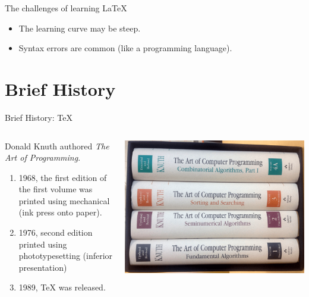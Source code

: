 \documentclass[english,aspectratio=169,14pt]{beamer}
\begin{document}
\begin{frame}{The challenges of learning \LaTeX}
    \begin{itemize}
        \item The learning curve may be steep.
        \item Syntax errors are common (like a programming language).
    \end{itemize}
\end{frame}

\section{Brief History}

\begin{frame}{Brief History: \TeX}
    \begin{columns}[T] %
    \begin{column}{9cm} %
    Donald Knuth authored \emph{The Art of Programming}.
    \begin{enumerate}
        \item 1968, the first edition of the first volume was printed using mechanical (ink press onto paper).
        \item 1976, second edition printed using phototypesetting (inferior presentation)
        \item 1989, \TeX{} was released.
    \end{enumerate}

    \end{column}
    \begin{column}{5cm} %

        \includegraphics[width=\textwidth]{images/TheArtOfProgrammingBoxSet}
    \end{column}
    \end{columns}
\end{frame}
\end{document}
